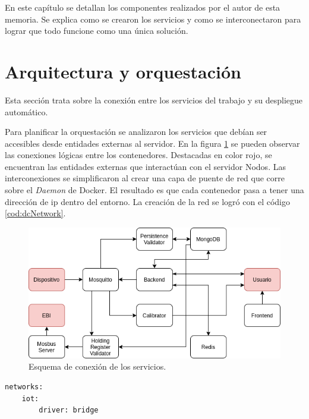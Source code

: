 En este capítulo se detallan los componentes realizados por el autor de esta memoria.
Se explica como se crearon los servicios y como se interconectaron para lograr que todo funcione como una única solución.

\section{Arquitectura y orquestación}
\label{ch3Arq}
Esta sección trata sobre la conexión entre los servicios del trabajo y su despliegue automático.

Para planificar la orquestación se analizaron los servicios que debían ser accesibles desde entidades externas al servidor.
En la figura \ref{fig:ch3EsquemaTrabajo} se pueden observar las conexiones lógicas entre los contenedores.
Destacadas en color rojo, se encuentran las entidades externas que interactúan con el servidor Nodos.
Las interconexiones se simplificaron al crear una capa de puente de red que corre sobre el \emph{Daemon} de Docker.
El resultado es que cada contenedor pasa a tener una dirección de ip dentro del entorno.
La creación de la red se logró con el código \ref{cod:dcNetwork}.

\begin{figure}[h]
	\centering
	\includegraphics[width=\textwidth]{./Figures/ch3EsquemaTrabajo.png}
	\caption{Esquema de conexión de los servicios.}
	\label{fig:ch3EsquemaTrabajo}
\end{figure}

\begin{lstlisting}[label=cod:dcNetwork,caption=Red de interconexión Docker Compose.]
networks: 
	iot:
		driver: bridge
\end{lstlisting}

